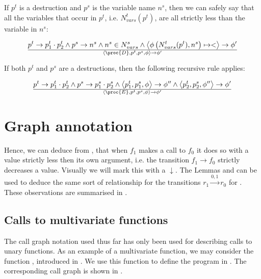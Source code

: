 If $p^t$ is a destruction and $p^s$ is the variable name $n^s$, then we can safely say that
all the variables that occur in $p^t$, i.e. $N_{vars}^t(p^t)$, are all strictly less
than the variable in $n^s$:

\begin{equation}
{
    p^t\rightarrow p^t_1\cdot p^t_2
  \wedge
    p^s\rightarrow n^s
  \wedge
    n^s\in N_{vars}^s
  \wedge
    \left\langle\phi\left(N_{vars}^t(p^t), n^s\right)\mapsto <\right\rangle\rightarrow\phi'
}\over{
  \left\langle\proc{D},p^t,p^s,\phi\right\rangle
  \rightarrow
  \phi'
}
\end{equation}

If both $p^t$ and $p^s$ are a destructions, then the following recursive rule applies:

\begin{equation}
{
    p^t\rightarrow p^t_1\cdot p^t_2
  \wedge
    p^s\rightarrow p^s_1\cdot p^s_2
  \wedge
    \left\langle p^t_1, p^s_1, \phi\right\rangle
    \rightarrow
    \phi''
  \wedge
    \left\langle p^t_2, p^s_2, \phi''\right\rangle
    \rightarrow
    \phi'
}\over{
  \left\langle\proc{E},p^t,p^s,\phi\right\rangle
  \rightarrow
  \phi'
}
\end{equation}

\section{Graph annotation}

Hence, we can deduce from , that when $f_1$ makes a
call to $f_0$ it does so with a value strictly less then its own argument,
i.e. the transition $f_1\rightarrow f_0$ strictly decreases a value. Visually
we will mark this with a $\downarrow$. The Lemmas 
and  can be used to deduce the same sort of
relationship for the transitions $r_1\xrightarrow{0,1} r_0$ for
. These observations are summarised in
.



\subsection{Calls to multivariate functions}

The call graph notation used thus far has only been used for describing calls
to unary functions. As an example of a multivariate function, we may consider
the function , introduced in
. We use this function to define the program in
. The corresponding call graph is shown in
.


